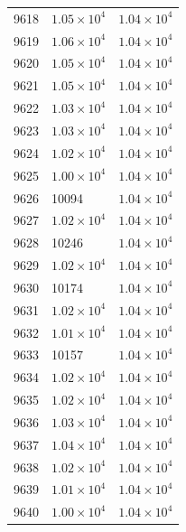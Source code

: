 \begin{table}[H]
\begin{tabular}{lll}
9618 & $\displaystyle 1.05 \times 10^{4}$ & $\displaystyle 1.04 \times 10^{4}$ \\
9619 & $\displaystyle 1.06 \times 10^{4}$ & $\displaystyle 1.04 \times 10^{4}$ \\
9620 & $\displaystyle 1.05 \times 10^{4}$ & $\displaystyle 1.04 \times 10^{4}$ \\
9621 & $\displaystyle 1.05 \times 10^{4}$ & $\displaystyle 1.04 \times 10^{4}$ \\
9622 & $\displaystyle 1.03 \times 10^{4}$ & $\displaystyle 1.04 \times 10^{4}$ \\
9623 & $\displaystyle 1.03 \times 10^{4}$ & $\displaystyle 1.04 \times 10^{4}$ \\
9624 & $\displaystyle 1.02 \times 10^{4}$ & $\displaystyle 1.04 \times 10^{4}$ \\
9625 & $\displaystyle 1.00 \times 10^{4}$ & $\displaystyle 1.04 \times 10^{4}$ \\
9626 & 10094 & $\displaystyle 1.04 \times 10^{4}$ \\
9627 & $\displaystyle 1.02 \times 10^{4}$ & $\displaystyle 1.04 \times 10^{4}$ \\
9628 & 10246 & $\displaystyle 1.04 \times 10^{4}$ \\
9629 & $\displaystyle 1.02 \times 10^{4}$ & $\displaystyle 1.04 \times 10^{4}$ \\
9630 & 10174 & $\displaystyle 1.04 \times 10^{4}$ \\
9631 & $\displaystyle 1.02 \times 10^{4}$ & $\displaystyle 1.04 \times 10^{4}$ \\
9632 & $\displaystyle 1.01 \times 10^{4}$ & $\displaystyle 1.04 \times 10^{4}$ \\
9633 & 10157 & $\displaystyle 1.04 \times 10^{4}$ \\
9634 & $\displaystyle 1.02 \times 10^{4}$ & $\displaystyle 1.04 \times 10^{4}$ \\
9635 & $\displaystyle 1.02 \times 10^{4}$ & $\displaystyle 1.04 \times 10^{4}$ \\
9636 & $\displaystyle 1.03 \times 10^{4}$ & $\displaystyle 1.04 \times 10^{4}$ \\
9637 & $\displaystyle 1.04 \times 10^{4}$ & $\displaystyle 1.04 \times 10^{4}$ \\
9638 & $\displaystyle 1.02 \times 10^{4}$ & $\displaystyle 1.04 \times 10^{4}$ \\
9639 & $\displaystyle 1.01 \times 10^{4}$ & $\displaystyle 1.04 \times 10^{4}$ \\
9640 & $\displaystyle 1.00 \times 10^{4}$ & $\displaystyle 1.04 \times 10^{4}$ \\

\end{tabular}
\end{table}
